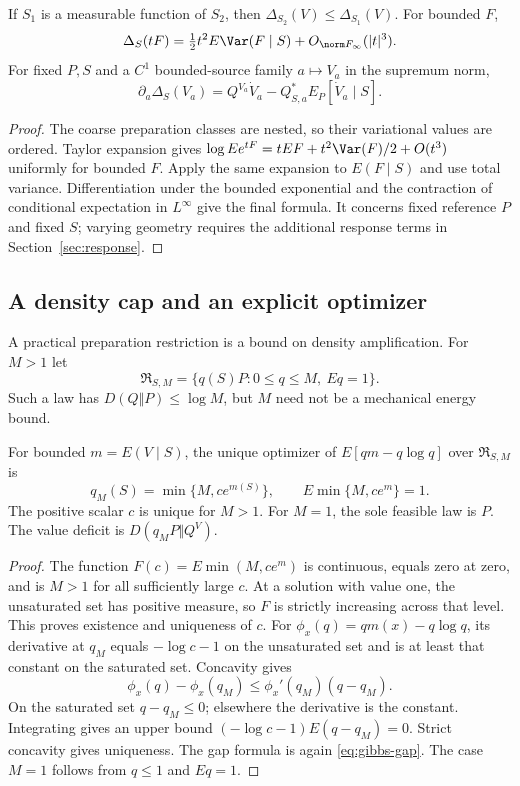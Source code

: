 \begin{proposition}\label{prop:coarse-expansion}
If $S_1$ is a measurable function of $S_2$, then
$\Delta_{S_2}(V)\le\Delta_{S_1}(V)$. For bounded $F$,
\[
 \Delta_S(tF)=\tfrac12t^2E\Var(F\mid S)+O_{\norm F_\infty}(|t|^3).
\]
For fixed $P,S$ and a $C^1$ bounded-source family $a\mapsto V_a$ in the supremum norm,
\[
 \partial_a\Delta_S(V_a)
 =Q^{V_a}\dot V_a-Q_{S,a}^*E_P[\dot V_a\mid S].
\]
\end{proposition}
\begin{proof}
The coarse preparation classes are nested, so their variational values are ordered. Taylor expansion gives
$\log Ee^{tF}=tEF+t^2\Var(F)/2+O(t^3)$ uniformly for bounded $F$. Apply the same expansion to $E(F\mid S)$ and use total variance. Differentiation under the bounded exponential and the contraction of conditional expectation in $L^\infty$ give the final formula. It concerns fixed reference $P$ and fixed $S$; varying geometry requires the additional response terms in Section~\ref{sec:response}.
\end{proof}

\subsection{A density cap and an explicit optimizer}
A practical preparation restriction is a bound on density amplification. For $M>1$ let
\[
 \mathfrak R_{S,M}=\{q(S)P:0\le q\le M,\ E q=1\}.
\]
Such a law has $D(Q\Vert P)\le\log M$, but $M$ need not be a mechanical energy bound.

\begin{theorem}\label{thm:cap}
For bounded $m=E(V\mid S)$, the unique optimizer of
$E[qm-q\log q]$ over $\mathfrak R_{S,M}$ is
\begin{equation}
 q_M(S)=\min\{M,c e^{m(S)}\},\qquad E\min\{M,ce^m\}=1.
 \label{eq:cap}
\end{equation}
The positive scalar $c$ is unique for $M>1$. For $M=1$, the sole feasible law is $P$. The value deficit is $D(q_MP\Vert Q^V)$.
\end{theorem}
\begin{proof}
The function $F(c)=E\min(M,ce^m)$ is continuous, equals zero at zero, and is $M>1$ for all sufficiently large $c$. At a solution with value one, the unsaturated set has positive measure, so $F$ is strictly increasing across that level. This proves existence and uniqueness of $c$.
For $\phi_x(q)=qm(x)-q\log q$, its derivative at $q_M$ equals $-\log c-1$ on the unsaturated set and is at least that constant on the saturated set. Concavity gives
\[
 \phi_x(q)-\phi_x(q_M)\le\phi_x'(q_M)(q-q_M).
\]
On the saturated set $q-q_M\le0$; elsewhere the derivative is the constant. Integrating gives an upper bound $(-\log c-1)E(q-q_M)=0$. Strict concavity gives uniqueness. The gap formula is again \eqref{eq:gibbs-gap}. The case $M=1$ follows from $q\le1$ and $Eq=1$.
\end{proof}

